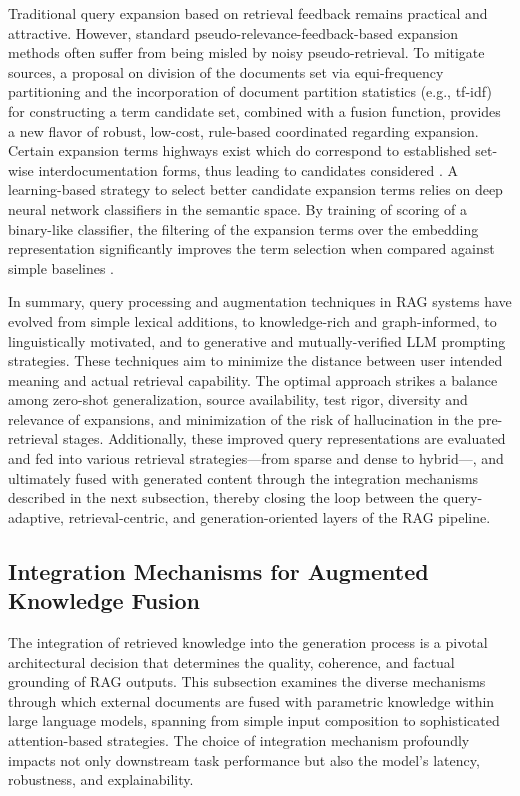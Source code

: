 \documentclass[11pt]{article}
\begin{document}
Traditional query expansion based on retrieval feedback remains practical and attractive. However, standard pseudo-relevance-feedback-based expansion methods often suffer from being misled by noisy pseudo-retrieval. To mitigate sources, a proposal on division of the documents set via equi-frequency partitioning and the incorporation of document partition statistics (e.g., tf-idf) for constructing a term candidate set, combined with a fusion function, provides a new flavor of robust, low-cost, rule-based coordinated regarding expansion. Certain expansion terms highways exist which do correspond to established set-wise interdocumentation forms, thus leading to candidates considered \cite{ref23}. A learning-based strategy to select better candidate expansion terms relies on deep neural network classifiers in the semantic space. By training of scoring of a binary-like classifier, the filtering of the expansion terms over the embedding representation significantly improves the term selection when compared against simple baselines \cite{ref36}.

In summary, query processing and augmentation techniques in RAG systems have evolved from simple lexical additions, to knowledge-rich and graph-informed, to linguistically motivated, and to generative and mutually-verified LLM prompting strategies. These techniques aim to minimize the distance between user intended meaning and actual retrieval capability. The optimal approach strikes a balance among zero-shot generalization, source availability, test rigor, diversity and relevance of expansions, and minimization of the risk of hallucination in the pre-retrieval stages. Additionally, these improved query representations are evaluated and fed into various retrieval strategies---from sparse and dense to hybrid---, and ultimately fused with generated content through the integration mechanisms described in the next subsection, thereby closing the loop between the query-adaptive, retrieval-centric, and generation-oriented layers of the RAG pipeline.

\subsection{Integration Mechanisms for Augmented Knowledge Fusion}

The integration of retrieved knowledge into the generation process is a pivotal architectural decision that determines the quality, coherence, and factual grounding of RAG outputs. This subsection examines the diverse mechanisms through which external documents are fused with parametric knowledge within large language models, spanning from simple input composition to sophisticated attention-based strategies. The choice of integration mechanism profoundly impacts not only downstream task performance but also the model's latency, robustness, and explainability.
\end{document}
